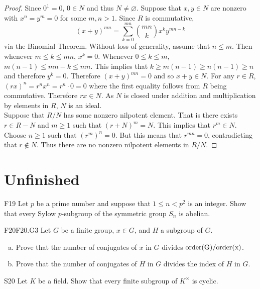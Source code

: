\documentclass{article}
\theoremstyle{definition}
\begin{document}
	\begin{proof}
	Since $0^1 = 0$, $0 \in N$ and thus $N \neq \varnothing$. Suppose that $x,y \in N$ are nonzero with $x^n = y^m = 0$ for some $m,n > 1$. Since $R$ is commutative,
		\[(x+y)^{mn} = \sum_{k=0}^{mn} {mn \choose k} x^k y^{mn - k} \]
	via the Binomial Theorem. Without loss of generality, assume that $n \leq m$. Then whenever $m \leq k \leq mn$, $x^k = 0$. Whenever $0 \leq k \leq m$, $m(n - 1) \leq mn - k \leq mn$. This implies that $k \geq m(n-1) \geq n(n-1) \geq n$ and therefore $y^k = 0$. Therefore $(x+y)^{mn} = 0$ and so $x + y \in N$. For any $r \in R$, $(rx)^n = r^nx^n = r^n \cdot 0 = 0$ where the first equality follows from $R$ being commutative. Therefore $rx \in N$. As $N$ is closed under addition and multiplication by elements in $R$, $N$ is an ideal.\\
	
	Suppose that $R/N$ has some nonzero nilpotent element. That is there exists $r \in R - N$ and $m \geq 1$ such that $(r+N)^m = N$. This implies that $r^m \in N$. Choose $n \geq 1$  such that $(r^m)^n = 0$. But this means that $r^{mn} = 0$, contradicting that $r \not\in N$. Thus there are no nonzero nilpotent elements in $R/N$.
	\end{proof}
	
\section{Unfinished}

	\begin{prob}{F19}{}
	Let $p$ be a prime number and suppose that $1 \leq n <p^2$ is an integer. Show that every Sylow $p$-subgroup of the symmetric group $S_n$ is abelian.
	\end{prob}
	

	\begin{prob}{F20}{F20.G3}
	Let $G$ be a finite group, $x \in G$, and $H$ a subgroup of $G$.
	\begin{enumerate}[(a)]
	\item Prove that the number of conjugates of $x$ in $G$ divides $\rm{order}(G)/\rm{order}(x)$.
	\item Prove that the number of conjugates of $H$ in $G$ divides the index of $H$ in $G$.
	\end{enumerate}
	\end{prob}

	\begin{prob}{S20}{}
	Let $K$ be a field. Show that every finite subgroup of $K^\times$ is cyclic.
	\end{prob}
\end{document}
